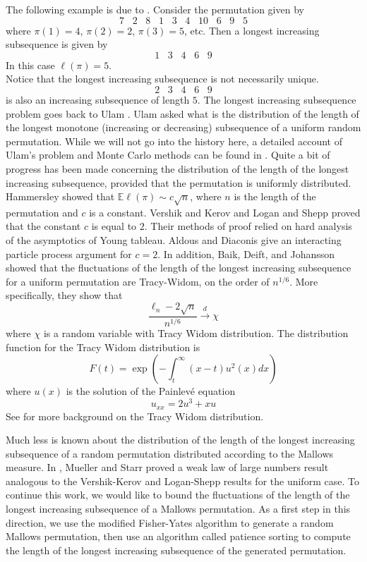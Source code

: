 \documentclass[12pt]{report}
\theoremstyle{definition}
\begin{document}
The following example is due to \cite{ADHamm}.  Consider the permutation given by 
$$
7\;\;\;2\;\;\;8\;\;\;1\;\;\;3\;\;\;4\;\;\;10\;\;\;6\;\;\;9\;\;\;5
$$
where $\pi(1)=4$, $\pi(2)=2$, $\pi(3)=5$, etc.  Then a longest increasing subsequence is given by 
$$
1\;\;\;3\;\;\;4\;\;\;6\;\;\;9
$$
In this case $\ell(\pi)=5$.  \\Notice that the longest increasing subsequence is not necessarily unique. 
$$
2\;\;\;3\;\;\;4\;\;\;6\;\;\;9
$$ is also an increasing subsequence of length $5$.  The longest increasing subsequence problem goes back to Ulam \cite{Ulam}.  Ulam asked what is the distribution of the length of the longest monotone (increasing or decreasing) subsequence of a uniform random permutation.  While we will not go into the history here, a detailed account of Ulam's problem and Monte Carlo methods can be found in \cite{Hammersley}.  Quite a bit of progress has been made concerning the distribution of the length of the longest increasing subsequence, provided that the permutation is uniformly distributed.  Hammersley \cite{Hammersley} showed that $\mathbb{E}\ell(\pi)\sim c\sqrt{n}$, where $n$ is the length of the permutation and $c$ is a constant.  Vershik and Kerov \cite{VershikKerov} and Logan and Shepp \cite{LS} proved that the constant $c$ is equal to $2$.  Their methods of proof relied on hard analysis of the asymptotics of Young tableau.  Aldous and Diaconis \cite{AldousDiaconis} give an interacting particle process argument for $c=2$.  In addition, Baik, Deift, and Johansson \cite{BDJ} showed that the fluctuations of the length of the longest increasing subsequence for a uniform permutation are Tracy-Widom, on the order of $n^{1/6}$.  More specifically, they show that 
$$
\frac{\ell_n-2\sqrt{n}}{n^{1/6}}\xrightarrow{d} \chi
$$
where $\chi$ is a random variable with Tracy Widom distribution.  The distribution function for the Tracy Widom distribution is 
$$
F(t)=\exp\left(-\int_t^{\infty}(x-t)u^2(x)dx\right)
$$
where $u(x)$ is the solution of the Painlev\'{e} equation 
$$
u_{xx}=2u^3+xu
$$
See \cite{BDJ} for more background on the Tracy Widom distribution.  

Much less is known about the distribution of the length of the longest increasing subsequence of a random permutation distributed according to the Mallows measure.  In \cite{MS}, Mueller and Starr proved a weak law of large numbers result analogous to the Vershik-Kerov and Logan-Shepp results for the uniform case.  To continue this work, we would like to bound the fluctuations of the length of the longest increasing subsequence of a Mallows permutation.  As a first step in this direction, we use the modified Fisher-Yates algorithm to generate a random Mallows permutation, then use an algorithm called patience sorting to compute the length of the longest increasing subsequence of the generated permutation.  
\end{document}
